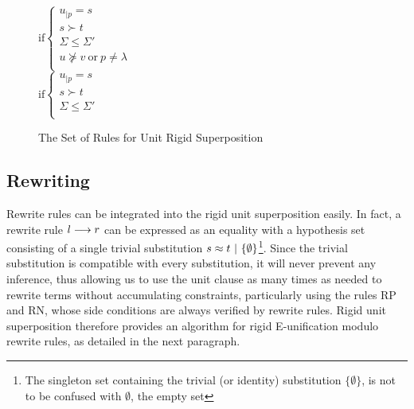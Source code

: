 \begin{figure}[htb]
\begin{center}
\doubleLine{}
\DP
$\text{if} \left\{\begin{array}{l}
u_{|p} = s\\
s \succ t\\
\Sigma \leq \Sigma'\\
u \not\succeq v ~ \text{or} ~ p \neq \lambda\\
\end{array}\right.$\\[12pt]

\doubleLine{}
\DP
$\text{if} \left\{\begin{array}{l}
u_{|p} = s\\
s \succ t\\
\Sigma \leq \Sigma'\\
\end{array}\right.$
\caption{The Set of Rules for Unit Rigid Superposition}
\label{fig:unit-sup-rules}
\end{center}
\end{figure}

\subsection{Rewriting}

Rewrite rules can be integrated into the rigid unit superposition easily. In fact,
a rewrite rule $l\longrightarrow{}r$ can be expressed as an equality with a hypothesis set
consisting of a single trivial substitution
$s\approx{}t ~|~ \{\emptyset\}$\footnote{The singleton set containing the trivial
(or identity) substitution $\{\emptyset\}$, is not to be confused with $\emptyset$, the empty set}.
Since the trivial substitution is compatible
with every substitution, it will never prevent any inference, thus allowing us
to use the unit clause as many times as needed to rewrite terms without
accumulating constraints, particularly using the rules RP and RN, whose side
conditions are always verified by rewrite rules. Rigid unit superposition
therefore provides an algorithm for rigid E-unification modulo rewrite rules,
as detailed in the next paragraph.

